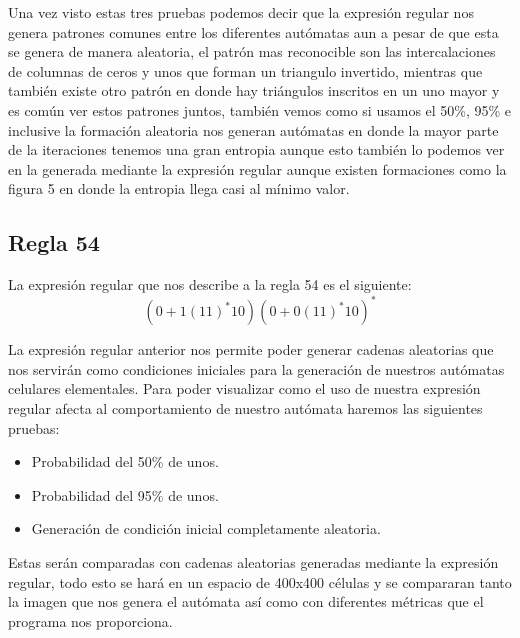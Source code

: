 \documentclass[11pt]{article}
\begin{document}
		 Una vez visto estas tres pruebas podemos decir que la expresión regular nos genera patrones comunes entre los diferentes autómatas aun a pesar de que esta se genera de manera aleatoria, el patrón mas reconocible son las intercalaciones de columnas de ceros y unos que forman un triangulo invertido, mientras que también existe otro patrón en donde hay triángulos inscritos en un uno mayor y es común ver estos patrones juntos, también vemos como si usamos el 50\%, 95\% e inclusive la formación aleatoria nos generan autómatas en donde la mayor parte de la iteraciones tenemos una gran entropia aunque esto también lo podemos ver en la generada mediante la expresión regular aunque existen formaciones como la figura 5 en donde la entropia llega casi al mínimo valor.
		\subsection{Regla 54}
		La expresión regular que nos describe a la regla 54 es el siguiente: \[(0+1(11)^\ast10)(0+0(11)^\ast10)^\ast\]\par
		La expresión regular anterior nos permite poder generar cadenas aleatorias que nos servirán como condiciones iniciales para la generación de nuestros autómatas celulares elementales. Para poder visualizar como el uso de nuestra expresión regular afecta al comportamiento de nuestro autómata haremos las siguientes pruebas:
		\begin{itemize}
    		 \item Probabilidad del 50\% de unos. 
		    \item Probabilidad del 95\% de unos.
		    \item Generación de condición inicial completamente aleatoria.
		\end{itemize}\par
		Estas serán comparadas con cadenas aleatorias generadas mediante la expresión regular, todo esto se hará en un espacio de 400x400 células y se compararan tanto la imagen que nos genera el autómata así como con diferentes métricas que el programa nos proporciona.
\end{document}
